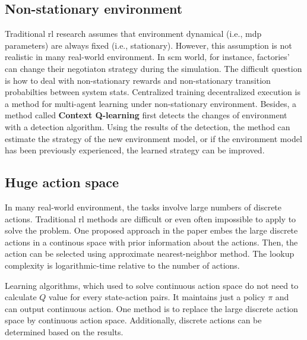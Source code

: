 \subsection{Non-stationary environment}
Traditional \gls{rl} research assumes that environment dynamical (i.e., \gls{mdp} parameters) are always fixed (i.e., stationary). However, this assumption is not realistic in many real-world environment. In \gls{scm} world, for instance, factories' can change their negotiaton strategy during the simulation. The difficult question is how to deal with non-stationary rewards and non-stationary transition probabilties between system stats. Centralized training decentralized execution\parencite{maddpg2017} is a method for multi-agent learning under non-stationary environment. Besides, a method called \textbf{Context Q-learning}\parencite{Padakandla_2020} first detects the changes of environment with a detection algorithm. Using the results of the detection, the method can estimate the strategy of the new environment model, or if the environment model has been previously experienced, the learned strategy can be improved.

\subsection{Huge action space}
In many real-world environment, the tasks involve large numbers of discrete actions. Traditional \gls{rl} methods are difficult or even often impossible to apply to solve the problem. One proposed approach in the paper \parencite{dulacarnold2016deep} embes the large discrete actions in a continous space with prior information about the actions. Then, the action can be selected using approximate nearest-neighbor method. The lookup complexity is logarithmic-time relative to the number of actions.

Learning algorithms, which used to solve continuous action space do not need to calculate $Q$ value for every state-action pairs. It maintains just a policy $\pi$ and can output continuous action. One method is to replace the large discrete action space by continuous action space. Additionally, discrete actions can be determined based on the results.
